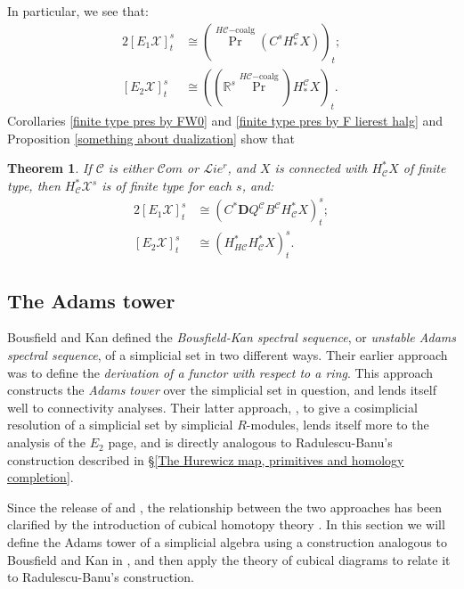 \documentclass[11pt]{amsart} \renewcommand{\baselinestretch}{1.2}
\theoremstyle{plain}
\newtheorem{thm}{Theorem}[section]
\theoremstyle{definition}
\DeclareMathOperator{\Prim}{Pr}
\newcommand{\scrL}{\mathscr{L}}
\newcommand{\scrC}{\mathscr{C}}
\newcommand{\calx}{\mathcal{X}}
\newcommand{\calc}{\mathcal{C}}
\newcommand{\HA}[1]{H#1}
\newcommand{\HC}[1]{H#1\mathrm{-coalg}}
\newcommand{\algs}{{\scrC\!\textit{om}}}
\newcommand{\restliealgs}{{\scrL\!\textit{ie}^\textit{r}}}
\newcommand{\algcat}{{\calc}}%
\newcommand{\Edownup}[5]{[E_{#1}^{#2}#3]^{#4}_{#5}}
\newcommand{\dual}{\mathbf{D}}
\begin{document}
\begin{Bousfield-Kan spectral sequence}
In particular, we see that:
\begin{alignat*}{2}
\Edownup{1}{}{\calx}{s}{t}&\cong (\Prim^{\HC{\calc}}(C^sH_*^{\algcat}X))_{t};\\
\Edownup{2}{}{\calx}{s}{t}&\cong((\mathbb{R}^s\Prim^{\HC{\calc}})H_*^{\algcat}X)_t.
\end{alignat*}
Corollaries \ref{finite type pres by FW0} and \ref{finite type pres by F lierest halg} and Proposition \ref{something about dualization} show that
\begin{thm}
\label{identify E2 with derived Q}
If $\algcat$ is either $\algs$ or $\restliealgs$, and $X$ is connected with $H^*_\calc X$  of finite type, then $H^*_\calc\calx^s$ is of finite type for each $s$, and:
\begin{alignat*}{2}
\Edownup{1}{}{\calx}{s}{t}&\cong (C^*\dual Q^\algcat B^\algcat H^*_{\algcat}X)^{s}_{t};\\
\Edownup{2}{}{\calx}{s}{t}&\cong (H^*_{\HA{\algcat}}H^*_{\algcat}X)^{s}_{t}.
\end{alignat*}
\end{thm}





\subsection{The Adams tower}\label{sec:derWRTab}\label{sec:relnWithRB}
Bousfield and Kan defined the \emph{Bousfield-Kan spectral sequence}, or \emph{unstable Adams spectral sequence}, of a simplicial set in two different ways. Their earlier approach \cite{BK_pairings.pdf} was to define the \emph{derivation of a functor with respect to a ring}. This approach constructs the \emph{Adams tower} over the simplicial set in question, and lends itself well to connectivity analyses. Their latter approach, \cite{BousKanSSeq.pdf}, to give a cosimplicial resolution of a simplicial set by simplicial $R$-modules, lends itself more to the analysis of the $E_2$ page, and is directly analogous to Radulescu-Banu's construction described in \S\ref{The Hurewicz map, primitives and homology completion}.

Since the release of \cite{BK_pairings.pdf} and \cite{BousKanSSeq.pdf}, the relationship between the two approaches has been clarified by the introduction of cubical homotopy theory \cite{GoodwillieCalcII}. In this section we will define the Adams tower of a simplicial algebra using a construction analogous to Bousfield and Kan in \cite{BK_pairings.pdf}, and then apply the theory of cubical diagrams to relate it to Radulescu-Banu's construction. 



\end{Bousfield-Kan spectral sequence}
\end{document}

